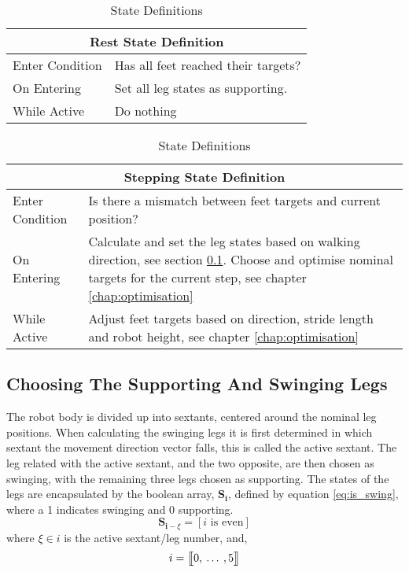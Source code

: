             \begin{table}[h]
                \center
                \begin{tabularx}{\textwidth}{|l|X|}
                    \hline
                    \multicolumn{2}{|c|}{Rest State Definition} \\
                    \hline
                    Enter Condition & Has all feet reached their targets? \\
                    \hline
                    On Entering & Set all leg states as supporting. \\
                    \hline
                    While Active & Do nothing \\
                    \hline
                \end{tabularx}
                
                \bigskip
                \noindent
                \begin{tabularx}{\textwidth}{|l|X|}
                    \hline
                    \multicolumn{2}{|c|}{Stepping State Definition} \\
                    \hline
                    Enter Condition & Is there a mismatch between feet targets and current position? \\
                    \hline
                    On Entering & Calculate and set the leg states based on walking direction, see section \ref{sec:supp_swing_calc}. Choose and optimise nominal targets
                    for the current step, see chapter \ref{chap:optimisation}\\
                    \hline
                    While Active & Adjust feet targets based on direction, stride length and robot height, see chapter \ref{chap:optimisation}\\
                    \hline
                \end{tabularx}
                \caption{State Definitions}
                \label{tab:state_defs}
            \end{table}

        \newpage
        \subsection{Choosing The Supporting And Swinging Legs} \label{sec:supp_swing_calc}
            The robot body is divided up into sextants, centered around the nominal leg positions. When calculating
            the swinging legs it is first determined in which sextant the movement direction vector falls, this is called the active sextant.
            The leg related with the active sextant, and the two opposite, are then chosen as swinging, with the remaining three legs chosen as supporting.
            The states of the legs are encapsulated by the boolean array, \(\bm{S_i}\), defined by equation \ref{eq:is_swing},
            where a 1 indicates swinging and 0 supporting.
            \begin{equation}\label{eq:is_swing}
                \bm{S}_{\bm{i} - \xi}=[i \text{ is even}]
            \end{equation}
            where \(\xi \in i\) is the active sextant/leg number, and,
            \[i = \seq{0}{1}{5}\]


